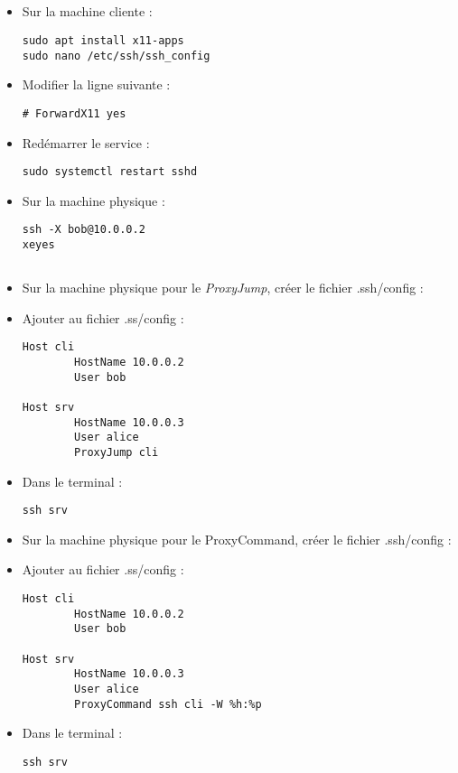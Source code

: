 \documentclass{article}
\begin{document}
\subsection{}

\begin{itemize}
\item Sur la machine cliente :
\begin{lstlisting}
sudo apt install x11-apps
sudo nano /etc/ssh/ssh_config
\end{lstlisting}
\item Modifier la ligne suivante :
\begin{lstlisting}
# ForwardX11 yes
\end{lstlisting}
\item Redémarrer le service :
\begin{lstlisting}
sudo systemctl restart sshd
\end{lstlisting}
\item Sur la machine physique :
\begin{lstlisting}
ssh -X bob@10.0.0.2
xeyes
\end{lstlisting}
\end{itemize}

\subsection{}

\begin{itemize}
\item Sur la machine physique pour le \emph{ProxyJump}, créer le fichier .ssh/config :
\item Ajouter au fichier .ss/config :
\begin{lstlisting}
Host cli
        HostName 10.0.0.2
        User bob

Host srv
        HostName 10.0.0.3
        User alice
        ProxyJump cli
\end{lstlisting}
\item Dans le terminal :
\begin{lstlisting}
ssh srv
\end{lstlisting}
\item Sur la machine physique pour le ProxyCommand, créer le fichier .ssh/config :
\item Ajouter au fichier .ss/config :
\begin{lstlisting}
Host cli
        HostName 10.0.0.2
        User bob

Host srv
        HostName 10.0.0.3
        User alice
        ProxyCommand ssh cli -W %h:%p
\end{lstlisting}
\item Dans le terminal :
\begin{lstlisting}
ssh srv
\end{lstlisting}
\end{itemize}
\end{document}
